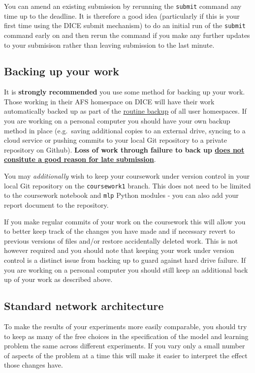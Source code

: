 \documentclass[11pt,]{article}
\begin{document}
You can amend an existing submission by rerunning the \texttt{submit}
command any time up to the deadline. It is therefore a good idea
(particularly if this is your first time using the DICE submit
mechanism) to do an initial run of the \texttt{submit} command early on
and then rerun the command if you make any further updates to your
submisison rather than leaving submission to the last minute.

\subsection{Backing up your work}\label{backing-up-your-work}

It is \textbf{strongly recommended} you use some method for backing up
your work. Those working in their AFS homespace on DICE will have their
work automatically backed up as part of the
\href{http://computing.help.inf.ed.ac.uk/backups-and-mirrors}{routine
backup} of all user homespaces. If you are working on a personal
computer you should have your own backup method in place (e.g.~saving
additional copies to an external drive, syncing to a cloud service or
pushing commits to your local Git repository to a private repository on
Github). \textbf{Loss of work through failure to back up
\href{http://tinyurl.com/edinflate}{does not consitute a good reason for
late submission}}.

You may \emph{additionally} wish to keep your coursework under version
control in your local Git repository on the \texttt{coursework1} branch.
This does not need to be limited to the coursework notebook and
\texttt{mlp} Python modules - you can also add your report document to
the repository.

If you make regular commits of your work on the coursework this will
allow you to better keep track of the changes you have made and if
necessary revert to previous versions of files and/or restore
accidentally deleted work. This is not however required and you should
note that keeping your work under version control is a distinct issue
from backing up to guard against hard drive failure. If you are working
on a personal computer you should still keep an additional back up of
your work as described above.

\subsection{Standard network
architecture}\label{standard-network-architecture}

To make the results of your experiments more easily comparable, you
should try to keep as many of the free choices in the specification of
the model and learning problem the same across different experiments. If
you vary only a small number of aspects of the problem at a time this
will make it easier to interpret the effect those changes have.
\end{document}
